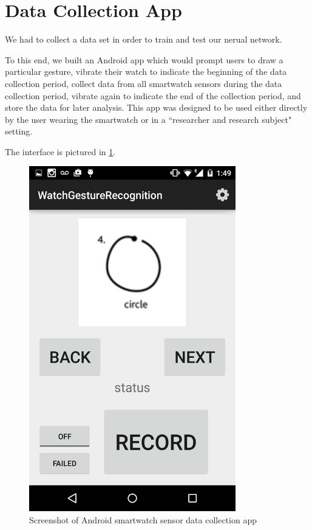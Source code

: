 \documentclass{report}
\begin{document}
\section{Data Collection App}

We had to collect a data set in order to train and test our nerual network.


To this end, we built an Android app which would prompt users to draw a particular gesture, vibrate their watch to indicate the beginning of the data collection period, collect data from all smartwatch sensors during the data collection period, vibrate again to indicate the end of the collection period, and store the data for later analysis. This app was designed to be used either directly by the user wearing the smartwatch or in a ``researcher and research subject" setting.

The interface is pictured in \ref{app}.

\begin{figure}[ht!]
  \label{app}
  \centering
  \includegraphics[width=90mm]{app}
  \caption{Screenshot of Android smartwatch sensor data collection app}
\end{figure}
\end{document}
